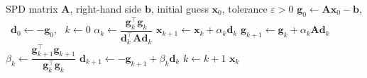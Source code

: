 \begin{algorithm}[ht]
  \caption{\textsc{Linear Conjugate Gradient}}
  \label{alg:ch5-linear-cg}
  \begin{algorithmic}
    \REQUIRE SPD matrix $\mathbf{A}$, right-hand side $\mathbf{b}$, initial guess $\mathbf{x}_0$, tolerance $\varepsilon>0$
    \STATE $\mathbf{g}_0\gets \mathbf{A}\mathbf{x}_0-\mathbf{b}$, \ $\mathbf{d}_0\gets -\mathbf{g}_0$, \ $k\gets 0$
      \STATE $\alpha_k\gets \dfrac{\mathbf{g}_k^{\top}\mathbf{g}_k}{\mathbf{d}_k^{\top}\mathbf{A}\mathbf{d}_k}$
      \STATE $\mathbf{x}_{k+1}\gets \mathbf{x}_k+\alpha_k \mathbf{d}_k$
      \STATE $\mathbf{g}_{k+1}\gets \mathbf{g}_k+\alpha_k \mathbf{A}\mathbf{d}_k$
      \STATE $\beta_k\gets \dfrac{\mathbf{g}_{k+1}^{\top}\mathbf{g}_{k+1}}{\mathbf{g}_k^{\top}\mathbf{g}_k}$
      \STATE $\mathbf{d}_{k+1}\gets -\mathbf{g}_{k+1}+\beta_k \mathbf{d}_k$
      \STATE $k\gets k+1$
    \ENDWHILE
    \RETURN $\mathbf{x}_k$
  \end{algorithmic}
\end{algorithm}

